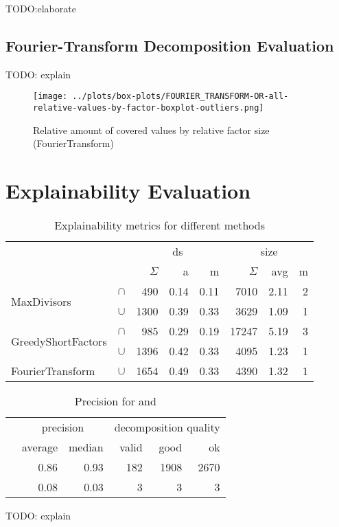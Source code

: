 TODO:elaborate

\newpage
\subsection{Fourier-Transform Decomposition Evaluation}
TODO: explain
\begin{figure}[h]
	\texttt{[image: ../plots/box-plots/FOURIER\_TRANSFORM-OR-all-relative-values-by-factor-boxplot-outliers.png]}
	\caption{Relative amount of covered values by relative factor size (FourierTransform)}
	\label{fig:eval:fourier-all-factors-box-plot}
\end{figure}

\newpage
\newpage
\section{Explainability Evaluation}
\begin{table}[h]
	\centering
	\begin{tabular}{ll|rrr|rrr}
		& &  \multicolumn{3}{c}{ds} & \multicolumn{3}{c}{size}  \\
		& & $\Sigma$ & a & m & $\Sigma$ & avg & m\\
		\hline
		\multirow{2}{*}{MaxDivisors} & $\cap$ & 490 & 0.14 & 0.11 & 7010 & 2.11 & 2 \\
		 & $\cup$ & 1300 & 0.39 & 0.33 & 3629 & 1.09 & 1 \\
		 \hline
		\multirow{2}{*}{GreedyShortFactors} & $\cap$ & 985 & 0.29 & 0.19 & 17247 & 5.19 & 3 \\
		& $\cup$ & 1396 & 0.42 & 0.33 & 4095 & 1.23 & 1 \\
		\hline
		FourierTransform & $\cup$ & 1654 & 0.49 & 0.33 & 4390 & 1.32 & 1 \\
	\end{tabular}
	\caption{Explainability metrics for different methods}
	\label{tab:eval-metric}
\end{table}

\begin{table}[h]
	\centering
	\begin{tabular}{l|rr|rrr}
		 & \multicolumn{2}{c}{precision} & \multicolumn{3}{c}{decomposition quality} \\
		 & average & median & valid & good & ok \\
		 \hline
		 \andDecomp & 0.86 & 0.93 &  182 & 1908 & 2670\\
		 \orDecomp & 0.08 & 0.03 & 3 & 3 & 3 \\
	\end{tabular}
	\caption{Precision for \andDecomp and \orDecomp}
	\label{tab:eval-precision}
\end{table}

TODO: explain
